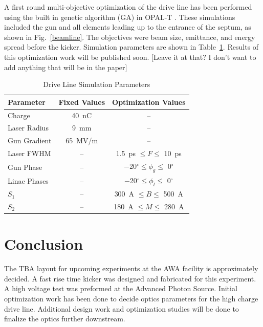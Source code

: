 \documentclass[letterpaper,  %
              ]{jacow-2_3}   %
\begin{document}
A first round multi-objective optimization of the drive line has been performed 
using the built in genetic algorithm (GA) in OPAL-T \cite{opal}. 
These simulations included the gun and all elements leading up 
to the entrance of the septum, as shown in Fig.~\ref{beamline}.
The objectives were beam size, emittance, and energy spread before the kicker.
Simulation parameters are shown in Table~\ref{simparam}.
Results of this optimization work will be published soon.
[Leave it at that? I don't want to add anything that will be in the paper]
\begin{table}[hbt]
	\centering
	\caption{Drive Line Simulation Parameters}
	\begin{tabular}{lcc}
		\toprule
		\textbf{Parameter} & \textbf{Fixed Values}  & \textbf{Optimization Values} \\
		\midrule
		Charge       & \SI{40}{nC}       & --   \\ %
		Laser Radius & \SI{9}{mm}        & --    \\
		Gun Gradient & \SI{65}{MV/m}     & --  \\ %
		Laser FWHM   & --      			 & \SI{1.5}{ps} $\leq F \leq $ \SI{10}{ps}	  \\ %
		Gun Phase    & -- 				 & \SI{-20}{}$^{\circ} \leq \phi_g \leq$ \SI{0}{}$^{\circ}$  \\	
		Linac Phases & --		         & \SI{-20}{}$^{\circ} \leq \phi_l \leq$ \SI{0}{}$^{\circ}$ 	  \\	 
		$S_1$        & --		 		 & \SI{300}{A} $\leq B \leq $ \SI{500}{A}	  \\
		$S_2$		 & --  	 			 & \SI{180}{A} $\leq M \leq $ \SI{280}{A}	  \\
		\bottomrule
	\end{tabular}
	\label{simparam}
\end{table}


\section{Conclusion}
The TBA layout for upcoming experiments at the 
AWA facility is approximately decided. A fast rise time kicker
was designed and fabricated for this experiment. 
A high voltage test was preformed at the 
Advanced Photon Source. Initial optimization 
work has been done to decide  
optics parameters for the high charge drive line.
Additional design work and optimization studies will be done 
to finalize the optics further downstream. 
\end{document}
